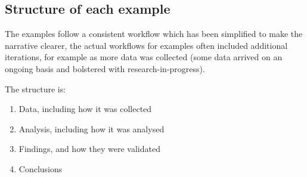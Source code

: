 \subsection*{Structure of each example}
The examples follow a consistent workflow which has been simplified to make the narrative clearer, the actual workflows for examples often included additional iterations, for example as more data was collected (some data arrived on an ongoing basis and bolstered with research-in-progress).

The structure is:

\begin{enumerate}

    \item Data, including how it was collected 
    \item Analysis, including how it was analysed
    \item Findings, and how they were validated
    \item Conclusions
\end{enumerate}

